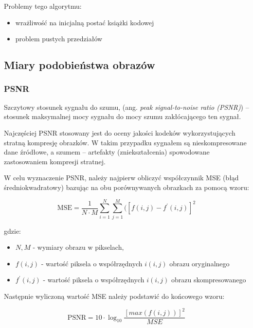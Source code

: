 \documentclass{article}
\begin{document}
Problemy tego algorytmu:

\begin{itemize}
  \item wrażliwość na inicjalną postać książki kodowej
  \item problem pustych przedziałów
\end{itemize}

\subsection{Miary podobieństwa obrazów}

\subsubsection{PSNR}

Szczytowy stosunek sygnału do szumu, (ang. \emph{peak signal-to-noise ratio (PSNR)}) – stosunek maksymalnej mocy sygnału do mocy szumu zakłócającego ten sygnał.  

Najczęściej PSNR stosowany jest do oceny jakości kodeków wykorzystujących stratną kompresję obrazków. 
W takim przypadku sygnałem są nieskompresowane dane źródłowe, a szumem – artefakty (zniekształcenia) spowodowane zastosowaniem kompresji stratnej. 

W celu wyznaczenie PSNR, należy najpierw obliczyć współczynnik MSE (błąd średniokwadratowy) bazując na obu porównywanych obrazkach za pomocą wzoru:

\begin{equation}
    \mathrm{MSE} = \frac{1}{N \cdot M} \sum_{i=1}^N \sum_{j=1}^M ([f(i, j) - f^{'}(i, j)]^2
\end{equation}

gdzie:
\begin{itemize}[label=]
  \item $N, M$ - wymiary obrazu w pikselach,
  \item $f(i, j)$ - wartość piksela o współrzędnych $i(i, j)$ obrazu oryginalnego
  \item $f^{'}(i, j)$ - wartość piksela o współrzędnych $i(i, j)$ obrazu skompresowanego
\end{itemize}

Następnie wyliczoną wartość MSE należy podstawić do końcowego wzoru: 

\begin{equation}
    \mathrm{PSNR} = 10 \cdot \log_{10} \frac{[max(f(i,j))]^2}{MSE}
\end{equation}
\end{document}
